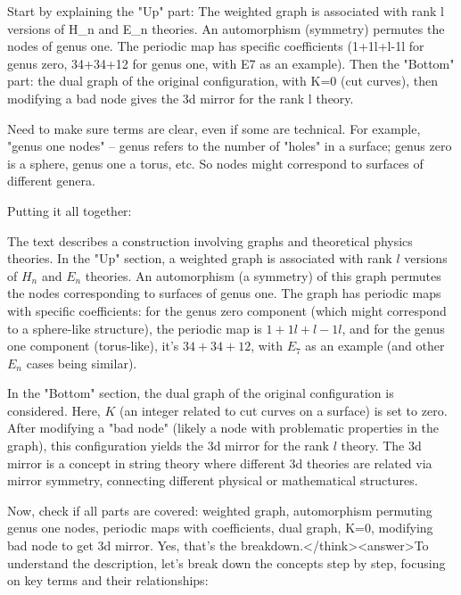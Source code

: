 Start by explaining the "Up" part: The weighted graph is associated with rank l versions of H_n and E_n theories. An automorphism (symmetry) permutes the nodes of genus one. The periodic map has specific coefficients (1+1l+l-1l for genus zero, 34+34+12 for genus one, with E7 as an example). Then the "Bottom" part: the dual graph of the original configuration, with K=0 (cut curves), then modifying a bad node gives the 3d mirror for the rank l theory.

Need to make sure terms are clear, even if some are technical. For example, "genus one nodes" – genus refers to the number of "holes" in a surface; genus zero is a sphere, genus one a torus, etc. So nodes might correspond to surfaces of different genera.

Putting it all together:

The text describes a construction involving graphs and theoretical physics theories. In the "Up" section, a weighted graph is associated with rank \( l \) versions of \( H_n \) and \( E_n \) theories. An automorphism (a symmetry) of this graph permutes the nodes corresponding to surfaces of genus one. The graph has periodic maps with specific coefficients: for the genus zero component (which might correspond to a sphere-like structure), the periodic map is \( 1 + 1l + l-1l \), and for the genus one component (torus-like), it's \( 34 + 34 + 12 \), with \( E_7 \) as an example (and other \( E_n \) cases being similar).  

In the "Bottom" section, the dual graph of the original configuration is considered. Here, \( K \) (an integer related to cut curves on a surface) is set to zero. After modifying a "bad node" (likely a node with problematic properties in the graph), this configuration yields the 3d mirror for the rank \( l \) theory. The 3d mirror is a concept in string theory where different 3d theories are related via mirror symmetry, connecting different physical or mathematical structures.  

Now, check if all parts are covered: weighted graph, automorphism permuting genus one nodes, periodic maps with coefficients, dual graph, K=0, modifying bad node to get 3d mirror. Yes, that's the breakdown.</think><answer>To understand the description, let’s break down the concepts step by step, focusing on key terms and their relationships:  


